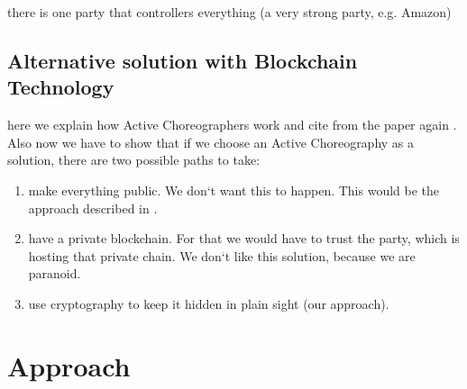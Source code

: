 \documentclass[runningheads]{llncs}
\begin{document}
there is one party that controllers everything (a very strong party, e.g. Amazon)


\subsection{Alternative solution with Blockchain Technology}
here we explain how Active Choreographers work and cite from the paper again \cite{weber2016untrusted}. Also now we have to show that if we choose an Active Choreography as a solution, there are two possible paths to take: 

\begin{enumerate}
    \item make everything public. We don`t want this to happen. This would be the approach described in \cite{weber2016untrusted}.
    \item have a private blockchain. For that we would have to trust the party, which is hosting that private chain. We don`t like this solution, because we are paranoid. 
    \item use cryptography to keep it hidden in plain sight (our approach).
\end{enumerate}

\section{Approach}
\end{document}
